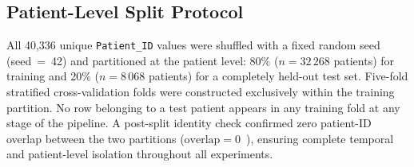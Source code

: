 \documentclass[conference,12pt]{IEEEtran}
\begin{document}
\begin{table}[!t]
  \centering
  \caption{PhysioNet 2019 Dataset Summary Statistics}
  \label{tab:dataset}
  \small
  \renewcommand{\arraystretch}{1.1}
\end{table}

\subsection{\textbf{Patient-Level Split Protocol}}
\label{sec:data:split}

All 40,336 unique \texttt{Patient\_ID} values were shuffled with a fixed random
seed (seed~=~42) and partitioned at the patient level:
80\% ($n = 32\,268$ patients) for training and
20\% ($n = 8\,068$ patients) for a completely held-out test set.
Five-fold stratified cross-validation folds were constructed exclusively within
the training partition.
No row belonging to a test patient appears in any training fold at any stage of
the pipeline.
A post-split identity check confirmed zero patient-ID overlap between the two
partitions ($\text{overlap} = 0$~\checkmark), ensuring complete temporal and
patient-level isolation throughout all experiments.
\end{document}
